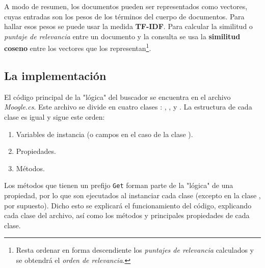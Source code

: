 \documentclass{article}
\begin{document}
A modo de resumen, los documentos pueden ser representados como vectores, cuyas entradas son los pesos de los términos del cuerpo de documentos. Para hallar esos pesos se puede usar la medida \textbf{TF-IDF}. Para calcular la similitud o \textit{puntaje de relevancia} entre un documento y la consulta se usa la \textbf{similitud coseno} entre los vectores que los representan\footnote{Resta ordenar en forma descendiente los \textit{puntajes de relevancia} calculados y se obtendrá el  \textit{orden de relevancia}.}. 
\subsection{La implementación}
El código principal de la "lógica" del buscador se encuentra en el archivo \textit{Moogle.cs}. Este archivo se divide en cuatro clases :  , ,  y . La estructura de cada clase es igual y sigue este orden:
\begin{enumerate}
\item Variables de instancia (o campos en el caso de la clase ).
\item Propiedades.
\item Métodos.
\end{enumerate}
Los métodos que tienen un prefijo \texttt{Get} forman parte de la "lógica" de una propiedad, por lo que son ejecutados al instanciar cada clase (excepto en la clase , por supuesto). Dicho esto se explicará el funcionamiento del código, explicando cada clase del archivo, así como los métodos y principales propiedades de cada clase.
\end{document}
